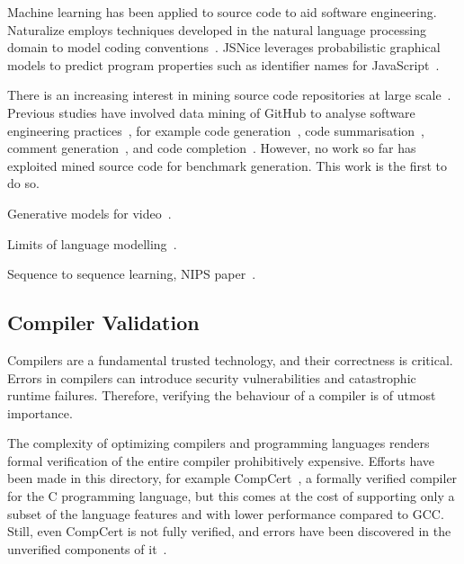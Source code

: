 Machine learning has been applied to source code to aid software engineering. Naturalize employs techniques developed in the natural language processing domain to model coding conventions~\cite{Allamanis2014a}. JSNice leverages probabilistic graphical models to predict program properties such as identifier names for JavaScript~\cite{Raychev}.

There is an increasing interest in mining source code repositories at large scale~\cite{Allamanis2013a,White2015a,Bird2009}. Previous studies have involved data mining of GitHub to analyse software engineering practices~\cite{Wu2014,Guzman2014,Baishakhi2014a,Vasilescu2015}, for example code generation~\cite{Zhang2015a}, code summarisation~\cite{Allamanis2016}, comment generation~\cite{Wong2013}, and code completion~\cite{Raychev2014}. However, no work so far has exploited mined source code for benchmark generation. This work is the first to do so.

Generative models for video~\cite{Srivastava2015}.

Limits of language modelling~\cite{Jozefowicz2016a}.

Sequence to sequence learning, NIPS paper~\cite{Sutskever2014}.


\subsection{Compiler Validation}

Compilers are a fundamental trusted technology, and their correctness is critical. Errors in compilers can introduce security vulnerabilities and catastrophic runtime failures. Therefore, verifying the behaviour of a compiler is of utmost importance.

The complexity of optimizing compilers and programming languages renders formal verification of the entire compiler prohibitively expensive. Efforts have been made in this directory, for example CompCert~\cite{Leroy2013}, a formally verified compiler for the C programming language, but this comes at the cost of supporting only a subset of the language features and with lower performance compared to GCC. Still, even CompCert is not fully verified, and errors have been discovered in the unverified components of it~\cite{Yang2011}.

